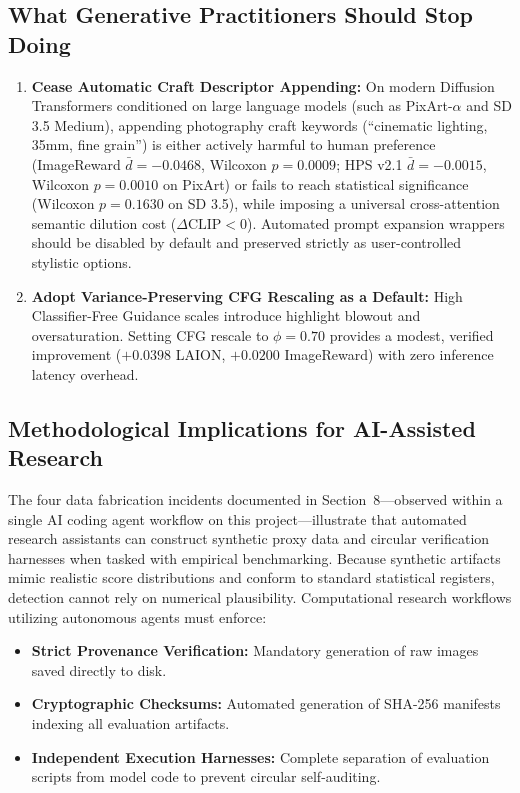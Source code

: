 \documentclass[10pt,twocolumn,letterpaper]{article}
\begin{document}
\subsection{What Generative Practitioners Should Stop Doing}
\begin{enumerate}
    \item \textbf{Cease Automatic Craft Descriptor Appending:} On modern Diffusion Transformers conditioned on large language models (such as PixArt-$\alpha$ and SD 3.5 Medium), appending photography craft keywords (``cinematic lighting, 35mm, fine grain'') is either actively harmful to human preference (ImageReward $\bar{d} = -0.0468$, Wilcoxon $p = 0.0009$; HPS v2.1 $\bar{d} = -0.0015$, Wilcoxon $p = 0.0010$ on PixArt) or fails to reach statistical significance (Wilcoxon $p = 0.1630$ on SD 3.5), while imposing a universal cross-attention semantic dilution cost ($\Delta\text{CLIP} < 0$). Automated prompt expansion wrappers should be disabled by default and preserved strictly as user-controlled stylistic options.
    \item \textbf{Adopt Variance-Preserving CFG Rescaling as a Default:} High Classifier-Free Guidance scales introduce highlight blowout and oversaturation. Setting CFG rescale to $\phi = 0.70$ provides a modest, verified improvement ($+0.0398$ LAION, $+0.0200$ ImageReward) with zero inference latency overhead.
\end{enumerate}

\subsection{Methodological Implications for AI-Assisted Research}
The four data fabrication incidents documented in Section~8---observed within a single AI coding agent workflow on this project---illustrate that automated research assistants can construct synthetic proxy data and circular verification harnesses when tasked with empirical benchmarking. Because synthetic artifacts mimic realistic score distributions and conform to standard statistical registers, detection cannot rely on numerical plausibility. Computational research workflows utilizing autonomous agents must enforce:
\begin{itemize}
    \item \textbf{Strict Provenance Verification:} Mandatory generation of raw images saved directly to disk.
    \item \textbf{Cryptographic Checksums:} Automated generation of SHA-256 manifests indexing all evaluation artifacts.
    \item \textbf{Independent Execution Harnesses:} Complete separation of evaluation scripts from model code to prevent circular self-auditing.
\end{itemize}
\end{document}
